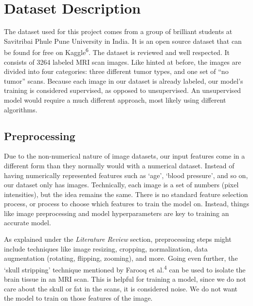 \documentclass[conference]{IEEEtran}
\begin{document}
\section{\large Dataset Description}

The dataset used for this project comes from a group of brilliant students at Savitribai Phule Pune University in India. It is an open source dataset that can be found for free on Kaggle\textsuperscript{6}. The dataset is reviewed and well respected. It consists of 3264 labeled MRI scan images. Like hinted at before, the images are divided into four categories: three different tumor types, and one set of “no tumor” scans. Because each image in our dataset is already labeled, our model's training is considered supervised, as opposed to unsupervised. An unsupervised model would require a much different approach, most likely using different algorithms.

\subsection{\large Preprocessing}

Due to the non-numerical nature of image datasets, our input features come in a different form than they normally would with a numerical dataset. Instead of having numerically represented features such as `age', `blood pressure', and so on, our dataset only has images. Technically, each image is a set of numbers (pixel intensities), but the idea remains the same. There is no standard feature selection process, or process to choose which features to train the model on. Instead, things like image preprocessing and model hyperparameters are key to training an accurate model.

As explained under the \textit{Literature Review} section, preprocessing steps might include techniques like image resizing, cropping, normalization, data augmentation (rotating, flipping, zooming), and more. Going even further, the `skull stripping' technique mentioned by Farooq et al.\textsuperscript{4} can be used to isolate the brain tissue in an MRI scan. This is helpful for training a model, since we do not care about the skull or fat in the scans, it is considered noise. We do not want the model to train on those features of the image.
\end{document}
